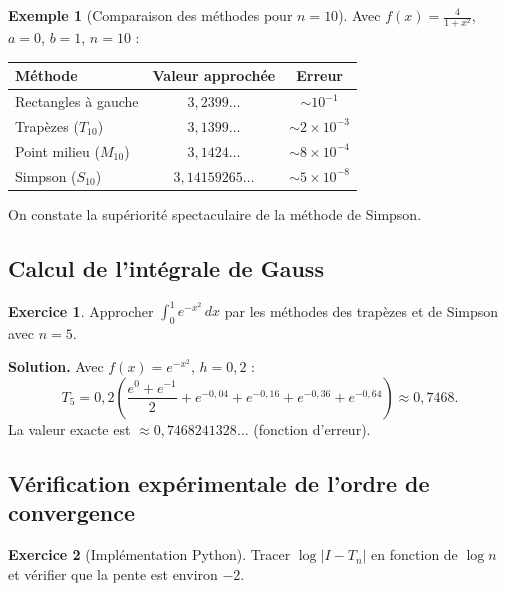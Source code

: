 \documentclass[a4paper,12pt]{article}
\theoremstyle{definition}
\newtheorem{exemple}{Exemple}[section]
\newtheorem{exercice}{Exercice}[section]
\theoremstyle{plain}
\theoremstyle{remark}
\newcommand{\abs}[1]{\left|#1\right|}
\begin{document}
\begin{exemple}[Comparaison des méthodes pour $n=10$]
Avec $f(x) = \frac{4}{1+x^2}$, $a=0$, $b=1$, $n=10$ :
\begin{center}
\begin{tabular}{@{}lcc@{}}
\toprule
\textbf{Méthode} & \textbf{Valeur approchée} & \textbf{Erreur} \\
\midrule
Rectangles à gauche & $3{,}2399\ldots$ & $\sim 10^{-1}$ \\
Trapèzes ($T_{10}$) & $3{,}1399\ldots$ & $\sim 2\times 10^{-3}$ \\
Point milieu ($M_{10}$) & $3{,}1424\ldots$ & $\sim 8\times 10^{-4}$ \\
Simpson ($S_{10}$) & $3{,}14159265\ldots$ & $\sim 5\times 10^{-8}$ \\
\bottomrule
\end{tabular}
\end{center}
On constate la supériorité spectaculaire de la méthode de Simpson.
\end{exemple}

\subsection{Calcul de l'intégrale de Gauss}

\begin{exercice}
Approcher $\displaystyle\int_0^1 e^{-x^2}\,dx$ par les méthodes des trapèzes et de Simpson avec $n = 5$.
\end{exercice}

\textbf{Solution.} Avec $f(x) = e^{-x^2}$, $h = 0{,}2$ :
\[
  T_5 = 0{,}2\left(\frac{e^0 + e^{-1}}{2} + e^{-0{,}04} + e^{-0{,}16} + e^{-0{,}36} + e^{-0{,}64}\right) \approx 0{,}7468.
\]
La valeur exacte est $\approx 0{,}7468241328\ldots$ (fonction d'erreur).

\subsection{Vérification expérimentale de l'ordre de convergence}

\begin{exercice}[Implémentation Python]
Tracer $\log\abs{I - T_n}$ en fonction de $\log n$ et vérifier que la pente est environ $-2$.
\end{exercice}
\end{document}
